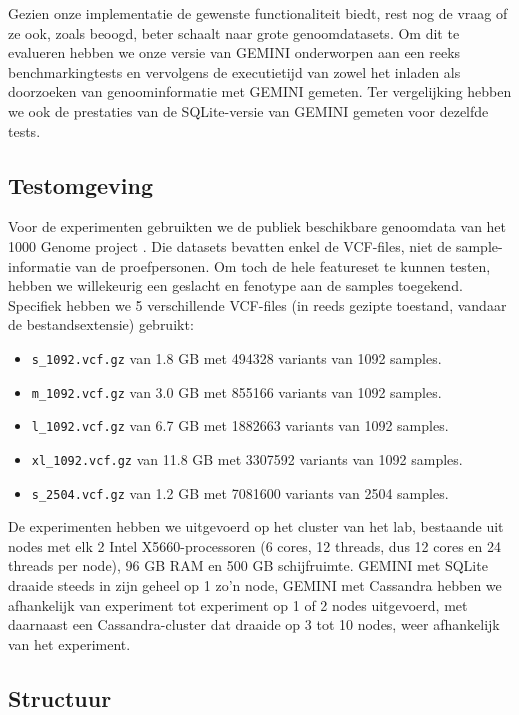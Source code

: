 Gezien onze implementatie de gewenste functionaliteit biedt, rest nog de vraag of ze ook, zoals beoogd, beter schaalt naar grote genoomdatasets. Om dit te evalueren hebben we onze versie van GEMINI onderworpen aan een reeks benchmarkingtests en vervolgens de executietijd van zowel het inladen als doorzoeken van genoominformatie met GEMINI gemeten. Ter vergelijking hebben we ook de prestaties van de SQLite-versie van GEMINI gemeten voor dezelfde tests.

\subsection*{Testomgeving}

Voor de experimenten gebruikten we de publiek beschikbare genoomdata van het 1000 Genome project \cite{10002012integrated}. Die datasets bevatten enkel de VCF-files, niet de sample-informatie van de proefpersonen. Om toch de hele featureset te kunnen testen, hebben we willekeurig een geslacht en fenotype aan de samples toegekend. Specifiek hebben we 5 verschillende VCF-files (in reeds gezipte toestand, vandaar de bestandsextensie) gebruikt:
\begin{itemize}
\item \texttt{s\_1092.vcf.gz} van 1.8 GB met 494328 variants van 1092 samples.
\item \texttt{m\_1092.vcf.gz} van 3.0 GB met 855166 variants van 1092 samples.
\item \texttt{l\_1092.vcf.gz} van 6.7 GB met 1882663 variants van 1092 samples.
\item \texttt{xl\_1092.vcf.gz} van 11.8 GB met 3307592 variants van 1092 samples.
\item \texttt{s\_2504.vcf.gz} van 1.2 GB met 7081600 variants van 2504 samples.
\end{itemize}

De experimenten hebben we uitgevoerd op het cluster van het lab, bestaande uit nodes met elk 2 Intel X5660-processoren (6 cores, 12 threads, dus 12 cores en 24 threads per node), 96 GB RAM en 500 GB schijfruimte. GEMINI met SQLite draaide steeds in zijn geheel op 1 zo'n node, GEMINI met Cassandra hebben we afhankelijk van experiment tot experiment op 1 of 2 nodes uitgevoerd, met daarnaast een Cassandra-cluster dat draaide op 3 tot 10 nodes, weer afhankelijk van het experiment.

\subsection*{Structuur}

